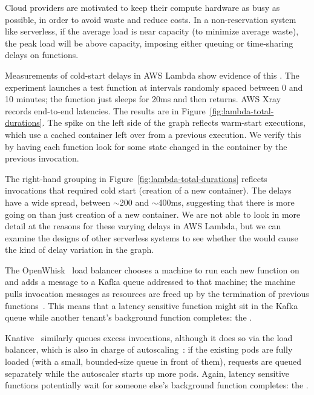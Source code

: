 Cloud providers are motivated to keep their compute hardware as busy
as possible, in order to avoid waste and reduce costs. In a
non-reservation system like serverless, if the average load is near
capacity (to minimize average waste), the peak load will be above
capacity, imposing either queuing or time-sharing delays on functions.


Measurements of cold-start delays in AWS Lambda show evidence
of
this \problem{}.
The experiment launches a test function at intervals randomly
spaced between 0 and 10 minutes; the function
just sleeps for 20ms and then returns. AWS Xray~\cite{aws-xray}
records end-to-end latencies.
The results are in Figure~\ref{fig:lambda-total-durations}. The spike
on the left side of the graph reflects warm-start executions,
which use a cached container left over from a previous execution.
We verify this by having each function look for some state changed
in the container by the previous invocation.

The right-hand grouping in Figure~\ref{fig:lambda-total-durations}
reflects invocations that required cold start (creation of a new
container). The delays have a wide spread, between $\sim$200 and
$\sim$400ms, suggesting that there is more going on than just creation
of a new container. We are not able to look in more detail at the
reasons for these varying delays in AWS Lambda, but we can examine the
designs of other serverless systems to see whether the {\problem}
would cause the kind of delay variation in the graph.

The OpenWhisk~\cite{openwhisk} load balancer chooses a machine to run
each new function on and adds a message to a Kafka queue addressed to
that machine; the machine pulls invocation messages as resources are
freed up by the termination of previous
functions~\cite{openwhisk-sched}. This means that 
a latency sensitive function might sit in the Kafka queue while
another tenant's background function completes: the \problem{}.

Knative~\cite{knative} similarly queues excess invocations, although it does
so via the load balancer, which is also in charge of
autoscaling~\cite{knative-sched}: if the existing pods are fully loaded (with a
small, bounded-size queue in front of them), requests are queued separately
while the autoscaler starts up more pods. Again, latency sensitive
functions potentially wait for someone else's background function
completes: the \problem{}.

